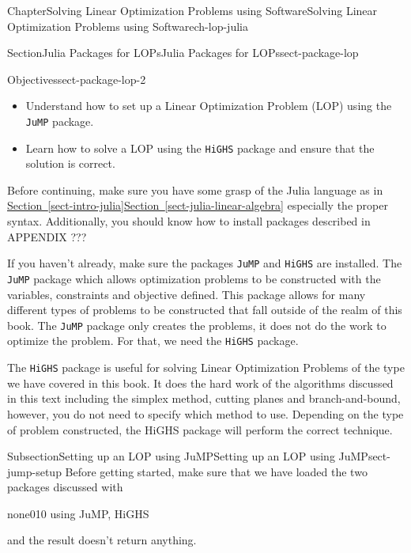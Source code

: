 \documentclass[oneside,10pt,]{book}
\newcommand{\xreffont}{\relax}
\newcommand{\mono}[1]{\texttt{#1}}
\numberwithin{equation}{section}
\begin{document}
\begin{chapterptx}{Chapter}{Solving Linear Optimization Problems using Software}{}{Solving Linear Optimization Problems using Software}{}{}{ch-lop-julia}
\begin{sectionptx}{Section}{Julia Packages for LOPs}{}{Julia Packages for LOPs}{}{}{sect-package-lop}
\begin{objectives}{Objectives}{sect-package-lop-2}
%
\begin{itemize}[label=\textbullet]
\item{}Understand how to set up a Linear Optimization Problem (LOP) using the \mono{JuMP} package.%
\item{}Learn how to solve a LOP using the \mono{HiGHS} package and ensure that the solution is correct.%
\end{itemize}
\end{objectives}
\begin{introduction}{}%
Before continuing, make sure you have some grasp of the Julia language as in \hyperref[sect-intro-julia]{Section~{\xreffont\ref{sect-intro-julia}}}\textendash{}\hyperref[sect-julia-linear-algebra]{Section~{\xreffont\ref{sect-julia-linear-algebra}}} especially the proper syntax. Additionally, you should know how to install packages described in APPENDIX ???%
\par
If you haven't already, make sure the packages \mono{JuMP} and \mono{HiGHS} are installed. The \mono{JuMP} package which allows optimization problems to be constructed with the variables, constraints and objective defined. This package allows for many different types of problems to be constructed that fall outside of the realm of this book. The \mono{JuMP} package only creates the problems, it does not do the work to optimize the problem. For that, we need the \mono{HiGHS} package.%
\par
The \mono{HiGHS} package is useful for solving Linear Optimization Problems of the type we have covered in this book. It does the hard work of the algorithms discussed in this text including the simplex method, cutting planes and branch-and-bound, however, you do not need to specify which method to use. Depending on the type of problem constructed, the HiGHS package will perform the correct technique.%
\end{introduction}%
%
%
\typeout{************************************************}
\typeout{************************************************}
%
\begin{subsectionptx}{Subsection}{Setting up an LOP using JuMP}{}{Setting up an LOP using JuMP}{}{}{sect-jump-setup}
Before getting started, make sure that we have loaded the two packages discussed with%
\begin{program}{none}{0}{1}{0}
using JuMP, HiGHS
\end{program}
and the result doesn't return anything.%

\end{subsectionptx}
\end{sectionptx}
\end{chapterptx}
\end{document}
